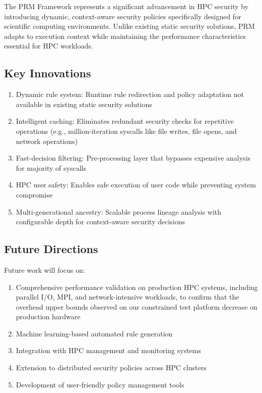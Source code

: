 \documentclass[]{sn-jnl}
\begin{document}
The PRM Framework represents a significant advancement in HPC security by
introducing dynamic, context-aware security policies specifically designed for
scientific computing environments. Unlike existing static security solutions, PRM
adapts to execution context while maintaining the performance characteristics
essential for HPC workloads.

\subsection{Key Innovations}

\begin{enumerate}
\item Dynamic rule system: Runtime rule redirection and policy adaptation
      not available in existing static security solutions
\item Intelligent caching: Eliminates redundant security checks for repetitive
      operations (e.g., million-iteration syscalls like file writes, file opens,
      and network operations)
\item Fast-decision filtering: Pre-processing layer that bypasses expensive
      analysis for majority of syscalls
\item HPC user safety: Enables safe execution of user code while preventing
      system compromise
\item Multi-generational ancestry: Scalable process lineage analysis with
      configurable depth for context-aware security decisions
\end{enumerate}

\subsection{Future Directions}

Future work will focus on:
\begin{enumerate}
\item Comprehensive performance validation on production HPC systems, including
      parallel I/O, MPI, and network-intensive workloads, to confirm that the
      overhead upper bounds observed on our constrained test platform decrease on
      production hardware
\item Machine learning-based automated rule generation
\item Integration with HPC management and monitoring systems
\item Extension to distributed security policies across HPC clusters
\item Development of user-friendly policy management tools
\end{enumerate}
\end{document}
